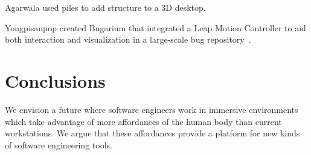 \documentclass[conference]{IEEEtran}
\begin{document}

Agarwala used piles to add structure to a 3D desktop.~\cite{Agarawala:BumpTop}

Yongpisanpop created Bugarium that integrated a Leap Motion Controller to aid both interaction and visualization in a large-scale bug repository~\cite{Bugarium}.



\section{Conclusions}

We envision a future where software engineers work in immersive environments which take advantage of more affordances of the human body than current workstations.
We argue that these affordances provide a platform for new kinds of software engineering tools. 




\end{document}
